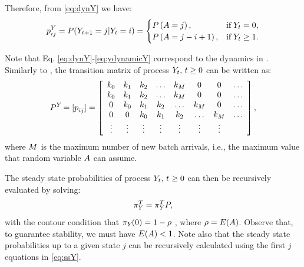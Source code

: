Therefore, from \eqref{eq:dynY} we have:
%
\begin{equation} \label{eq:ydynamicY}
p_{ij}^{Y_{}} = P(Y_{t+1} = j | Y_{t} = i ) = \begin{cases}
    P\left( A = j  \right), & \text{if} \; Y_{t} = 0, \\
    P\left( A = j-i + 1 \right),  & \text{if} \; Y_{t} \ge 1.
\end{cases}
\end{equation}
%

Note that Eq. \eqref{eq:dynY}-\eqref{eq:ydynamicY} correspond to the dynamics in \citet[Section 6.1.2]{Shortle2018}. Similarly to \citet{Shortle2018}, the transition matrix of process $Y_{t}, \, t \ge 0$ can be written as:
%
\begin{equation}
P_{}^{Y_{}} = [p_{ij}^{}] = \left[
\begin{array}{cccccccc}
k_0 & k_1 & k_2 & \ldots & k_M & 0 & 0 & \ldots \\
k_0 & k_1 & k_2 & \ldots & k_M & 0 & 0 & \ldots \\
0 & k_0 & k_1 & k_2 & \ldots & k_M & 0 & \ldots \\
0 & 0 & k_0 & k_1 & k_2 & \ldots & k_M & \ldots \\
\vdots & \vdots & \vdots & \vdots & \vdots & \vdots & \vdots & 
\end{array}
\right],
\end{equation}
%
where $M$ is the maximum number of new batch arrivals, i.e., the maximum value that random variable $A$ can assume.

The steady state probabilities of process $Y_{t}, \, t \ge 0$ can then be recursively evaluated by solving:
\begin{equation} \label{eq:ssY}
\pi_{Y_{}}^T = \pi_{Y_{}}^T P,
\end{equation}
%
with the contour condition that $\pi_{Y_{}}(0) = 1 - \rho $ \citep[Eq. (6.12)]{Shortle2018}, 
%
%
where $\rho = E(A)$. Observe that, to guarantee stability, we must have $E(A) < 1$. Note also that the steady state probabilities up to a given state $j$ can be recursively calculated using the first $j$ equations in \eqref{eq:ssY}.


